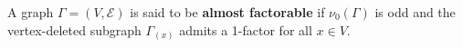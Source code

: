 A graph $\Gamma = (V, \mathcal{E})$ is said to be \textbf{almost factorable} if $\nu_0(\Gamma)$ is odd and the vertex-deleted subgraph $\Gamma_{(x)}$ admits a 1-factor for all $x \in V$.
